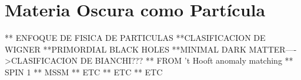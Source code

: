 \chapter{Materia Oscura como Partícula}
** ENFOQUE DE FISICA DE PARTICULAS
**CLASIFICACION DE WIGNER
**PRIMORDIAL BLACK HOLES
**MINIMAL DARK MATTER---->CLASIFICACION DE BIANCHI???
** FROM 't Hooft anomaly matching
** SPIN 1
** MSSM
** ETC 
** ETC 
** ETC
